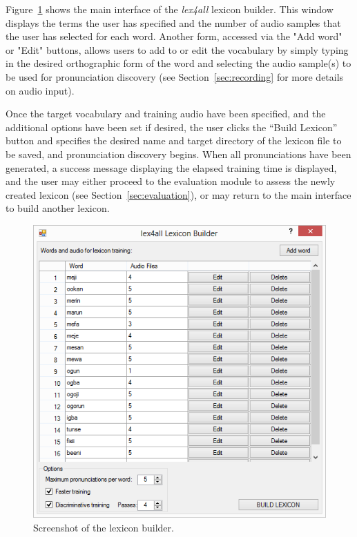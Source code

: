 \documentclass[11pt]{article}
\begin{document}
Figure~\ref{fig:mainform} shows the main interface of the \textit{lex4all} lexicon builder. This window displays the terms the user has specified and the number of audio samples that the user has selected for each word. Another form, accessed via the "Add word" or "Edit" buttons, allows users to add to or edit the vocabulary by simply typing in the desired orthographic form of the word and selecting the audio sample(s) to be used for pronunciation discovery (see Section~\ref{sec:recording} for more details on audio input).


Once the target vocabulary and training audio have been specified, and the additional options have been set if desired, the user clicks the ``Build Lexicon'' button and specifies the desired name and target directory of the lexicon file to be saved, 
and pronunciation discovery begins. 
When all pronunciations have been generated, a success message displaying the elapsed training time is displayed, and the user may either proceed to the evaluation module to assess the newly created lexicon (see Section~\ref{sec:evaluation}), or may return to the main interface to build another lexicon. 

\begin{figure}[tb]
\begin{center}
\includegraphics[width=\columnwidth]{../screenshots/LexiconBuilder-Main-Filled-scrolling.PNG}
\caption{Screenshot of the lexicon builder.\label{fig:mainform}}
\end{center}
\end{figure}
\end{document}
